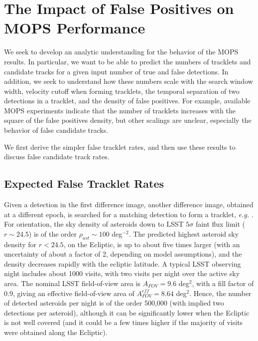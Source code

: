 \section{The Impact of False Positives on MOPS Performance \label{sec:appMOPS}}


We seek to develop an analytic understanding for the behavior of the MOPS results.
In particular, we want to be able to predict the numbers of tracklets and
candidate tracks for a given input number of true and false detections. In addition, we seek
to understand how these numbers scale with the search window width,
velocity cutoff when forming tracklets, the temporal separation of two
detections in a tracklet, and the density of false positives. For example, available
MOPS experiments indicate that the number of tracklets increases with
the square of the false positives density, but other scalings are unclear,
especially the behavior of false candidate tracks.

We first derive the simpler false tracklet rates, and then use these results to
discuss false candidate track rates. 


\subsection{Expected False Tracklet Rates \label{sec:tracklets} }

Given a detection in the first difference image, another difference image, obtained at a different epoch,
is searched for a matching detection to form a tracklet,  {\it e.g.} \citet{denneau13, kubica07}. For orientation,
the sky density of asteroids down to LSST $5\sigma$ faint flux limit ($r \sim 24.5$) is of the order
$\rho_{ast} \sim 100$ deg$^{-2}$. The predicted highest asteroid sky density for $r<24.5$,
on the Ecliptic, is up to about five times larger (with an uncertainty of about a factor of 2,
depending on model assumptions), and the density decreases rapidly with the ecliptic latitude.
A typical LSST observing night includes about 1000 visits, with two visits per night over
the active sky area. The nominal LSST field-of-view area is $A_{FOV}=9.6$ deg$^2$, with a
fill factor of 0.9, giving an effective field-of-view area of $A_{FOV}^{eff}=8.64$ deg$^2$. Hence,
the number of detected asteroids per night is of the order 500,000 (with implied two detections
per asteroid), although it can be significantly lower when the Ecliptic is not well covered (and
it could be a few times higher if the majority of visits were obtained along the Ecliptic).

